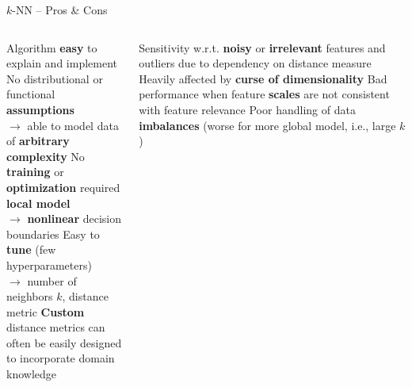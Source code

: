 \begin{frame2}{$k$-NN -- Pros \& Cons}
  \footnotesize

\begin{columns}[onlytextwidth]
  \begin{column}{0.51\textwidth}
    \begin{itemize}
      \positem Algorithm \textbf{easy} to explain and implement
      \positem No distributional or functional \textbf{assumptions}\\
      $\rightarrow$ able to model data of \textbf{arbitrary complexity} %
      \positem No \textbf{training} or \textbf{optimization} required 
      \positem \textbf{local model}\\ $\rightarrow$ \textbf{nonlinear} decision boundaries
      \positem Easy to \textbf{tune} (few hyperparameters)\\
      $\rightarrow$ number of neighbors $k$, distance metric
      \positem \textbf{Custom} distance metrics can often be easily designed to incorporate domain knowledge
    \end{itemize}
  \end{column}
  \begin{column}{0.49\textwidth}
    \begin{itemize}
      \negitem Sensitivity w.r.t. \textbf{noisy} or \textbf{irrelevant} features and outliers due to dependency on distance measure
      \negitem Heavily affected by \textbf{curse of dimensionality}
      \negitem Bad performance when feature \textbf{scales} are not consistent with feature relevance
      \negitem Poor handling of data \textbf{imbalances} (worse for more global model, i.e., large $k$)
    \end{itemize}
  \end{column}
\end{columns}
  
\end{frame2}
